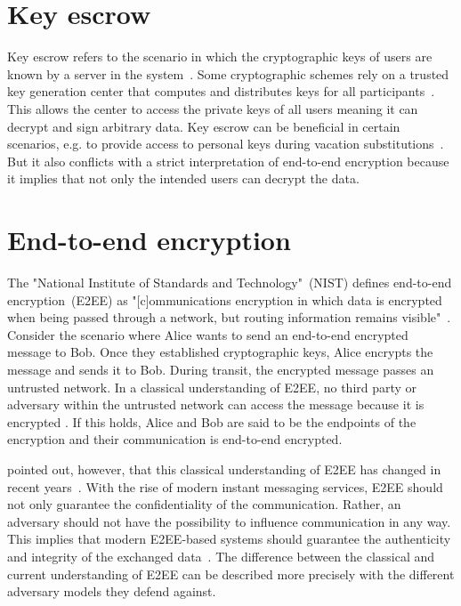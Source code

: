 \documentclass[../main.tex]{subfiles}
\begin{document}
\section{Key escrow}
\label{sec:key-escrow}
Key escrow refers to the scenario in which the cryptographic keys of users are known by a server in the system~\cite{Gentry2003}.
Some cryptographic schemes rely on a trusted key generation center that computes and distributes keys for all participants~\cite{Sakai2007, Bethencourt2007}.
This allows the center to access the private keys of all users meaning it can decrypt and sign arbitrary data.
Key escrow can be beneficial in certain scenarios, e.g. to provide access to personal keys during vacation substitutions~\cite{Hagg2022}.
But it also conflicts with a strict interpretation of end-to-end encryption because it implies that not only the intended users can decrypt the data.

\section{End-to-end encryption} 
\label{sec:end-to-end}

The "National Institute of Standards and Technology"~(NIST) defines end-to-end encryption~(E2EE) as 
"[c]ommunications encryption in which data is encrypted when being passed through a network, but routing information remains visible"~\cite[88]{Nieles2017}.
Consider the scenario where Alice wants to send an end-to-end encrypted message to Bob.
Once they established cryptographic keys, Alice encrypts the message and sends it to Bob.
During transit, the encrypted message passes an untrusted network.
In a classical understanding of E2EE, no third party or adversary within the untrusted network can access the message because it is encrypted \cite{Ermoshina2016}.
If this holds, Alice and Bob are said to be the endpoints of the encryption and their communication is end-to-end encrypted.

\citeauthor{Hale2022} pointed out, however, that this classical understanding of E2EE has changed in recent years~\cite{Hale2022}. 
With the rise of modern instant messaging services, E2EE should not only guarantee the confidentiality of the communication.
Rather, an adversary should not have the possibility to influence communication in any way.
This implies that modern E2EE-based systems should guarantee the authenticity and integrity of the exchanged data~\cite{Hale2022}. 
The difference between the classical and current understanding of E2EE can be described more precisely with the different adversary models they defend against.
\end{document}
